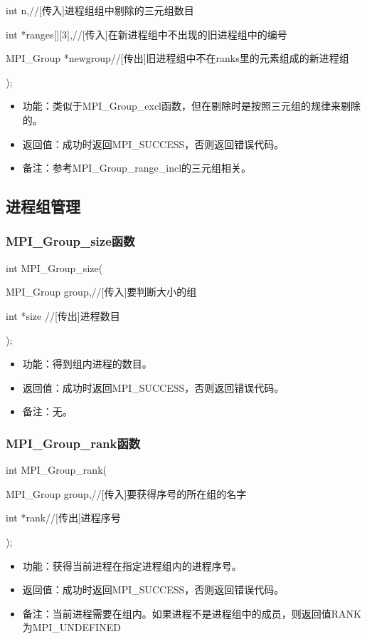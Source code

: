 \documentclass[UTF8]{article}%
\begin{document}
    \qquad int          n,//[传入]进程组组中剔除的三元组数目

    \qquad int          *ranges[][3],//[传入]在新进程组中不出现的旧进程组中的编号

    \qquad MPI\_Group   *newgroup//[传出]旧进程组中不在ranks里的元素组成的新进程组

);

\begin{itemize}
    \item 功能：类似于MPI\_Group\_excl函数，但在剔除时是按照三元组的规律来剔除的。
    \item 返回值：成功时返回MPI\_SUCCESS，否则返回错误代码。
    \item 备注：参考MPI\_Group\_range\_incl的三元组相关。
\end{itemize}

\subsection{进程组管理}

\subsubsection{MPI\_Group\_size函数}

int MPI\_Group\_size(
    
    \qquad MPI\_Group group,//[传入]要判断大小的组

    \qquad int       *size //[传出]进程数目

);

\begin{itemize}
    \item 功能：得到组内进程的数目。
    \item 返回值：成功时返回MPI\_SUCCESS，否则返回错误代码。
    \item 备注：无。
\end{itemize}

\subsubsection{MPI\_Group\_rank函数}

int MPI\_Group\_rank(

    \qquad MPI\_Group group,//[传入]要获得序号的所在组的名字

    \qquad int        *rank//[传出]进程序号

);

\begin{itemize}
    \item 功能：获得当前进程在指定进程组内的进程序号。
    \item 返回值：成功时返回MPI\_SUCCESS，否则返回错误代码。
    \item 备注：当前进程需要在组内。如果进程不是进程组中的成员，则返回值RANK为MPI\_UNDEFINED
\end{itemize}
\end{document}
